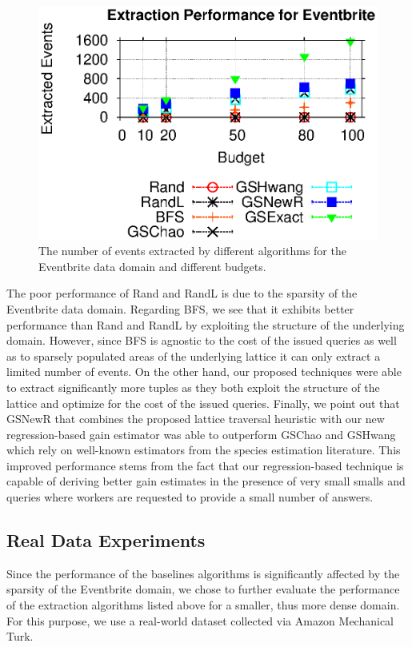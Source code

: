 \documentclass{vldb}
\begin{document}
\begin{figure}[h]
	\begin{center}
	\includegraphics[clip,scale=0.6]{figs/ebExtraction.eps}
	\caption{The number of events extracted by different algorithms for the Eventbrite data domain and different budgets.}
	\label{fig:ebextraction}
	\end{center}
\end{figure}

The poor performance of Rand and RandL is due to the sparsity of the Eventbrite data domain. Regarding BFS, we see that it exhibits better performance than Rand and RandL by exploiting the structure of the underlying domain. However, since BFS is agnostic to the cost of the issued queries as well as to sparsely populated areas of the underlying lattice it can only extract a limited number of events. On the other hand, our proposed techniques were able to extract significantly more tuples as they both exploit the structure of the lattice and optimize for the cost of the issued queries. Finally, we point out that GSNewR that combines the proposed lattice traversal heuristic with our new regression-based gain estimator was able to outperform GSChao and GSHwang which rely on well-known estimators from the species estimation literature. This improved performance stems from the fact that our regression-based technique is capable of deriving better gain estimates in the presence of very small smalls and queries where workers are requested to provide a small number of answers.


\subsection{Real Data Experiments}
\label{sec:realdata}
Since the performance of the baselines algorithms is significantly affected by the sparsity of the Eventbrite domain, we chose to further evaluate the performance of the extraction algorithms listed above for a smaller, thus more dense domain. For this purpose, we use a real-world dataset collected via Amazon Mechanical Turk. 
\end{document}
